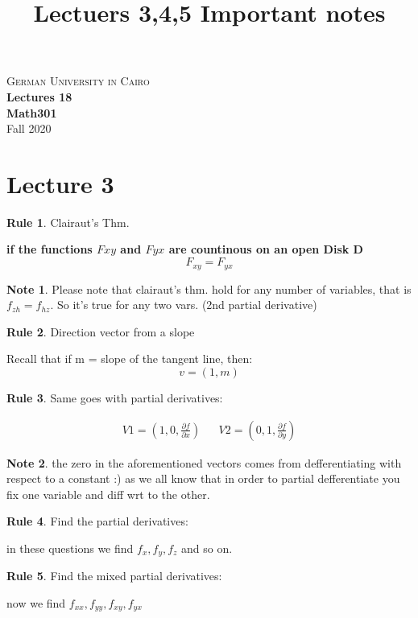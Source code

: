 \documentclass[11pt]{article}
\theoremstyle{definition}
\newtheorem{reg}{Rule}
\newtheorem{note}{Note}
\begin{document}
\setcounter{section}{0}
\title{Lectuers 3,4,5 Important notes}

\thispagestyle{empty}
\begin{center}
\textsc{\LARGE German University in Cairo}\\[1.0cm]
{\LARGE \bf Lectures 18}\\ [0.5cm]
{\large \bf Math301}\\ [0.5cm]
Fall 2020
\end{center}
\tableofcontents
\section{Lecture 3}
\begin{reg}
Clairaut's Thm.
\end{reg}
\textbf{if the functions $Fxy$ and $Fyx$ are countinous on an open Disk D}
\begin{equation}
	F_{xy}=F_{yx}
\end{equation}
\begin{note}
	Please note that clairaut's thm. hold for any number of variables, that is $f_{zh} = f_{hz}$. So it's true for any two vars. (2nd partial derivative)
\end{note}
\begin{reg}
Direction vector from a slope
\end{reg}
Recall that if m = slope of the tangent line, then:
\begin{equation}
	v = (1,m)
\end{equation}
\begin{reg}
Same goes with partial derivatives:
\end{reg}
\begin{align}
	V1 = (1,0,\frac{\partial f}{\partial x}) &&
V2= (0,1,\frac{\partial f}{\partial y})
\end{align}
\begin{note}
	the zero in the aforementioned vectors comes from defferentiating with respect to a constant :) as we all know that in order to partial defferentiate you fix one variable and diff wrt to the other.

\end{note}
\begin{reg}
Find the partial derivatives:
\end{reg}
in these questions we find $f_x, f_y, f_z$ and so on.
\begin{reg}
Find the mixed partial derivatives:
\end{reg}
now we find $f_{xx}, f_{yy}, f_{xy}, f_{yx}$
\end{document}
